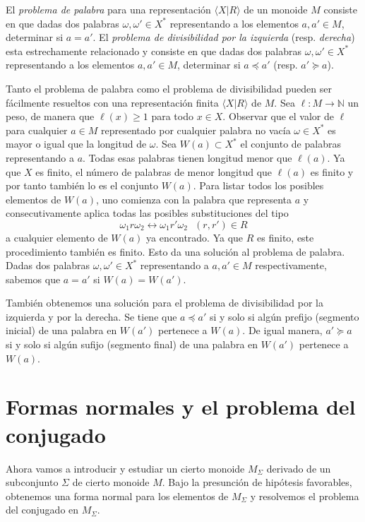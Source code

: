 \documentclass[12pt]{book}
\theoremstyle{definition}
\begin{document}
El \textit{problema de palabra} para una representación $\langle X|R\rangle$ de un monoide $M$ consiste en que dadas dos palabras $\omega,\omega'\in X^*$ representando a los elementos $a,a'\in M$, determinar si $a=a'$. El \textit{problema de divisibilidad por la izquierda} (resp. \textit{derecha}) esta estrechamente relacionado y consiste en que dadas
dos palabras $\omega,\omega'\in X^*$ representando a los elementos $a,a'\in M$, determinar si $a\preceq a'$ (resp. $a'\succeq a$).

Tanto el problema de palabra como el problema de divisibilidad pueden ser fácilmente resueltos con una representación finita $\langle X|R\rangle$ de $M$. Sea $\ell:M\rightarrow\mathbb{N}$ un peso, de manera que $\ell(x)\geq 1$ para todo $x\in X$. Observar que el valor de $\ell$ para cualquier $a\in M$ representado por cualquier palabra no vacía $\omega\in X^*$ es mayor o igual que la longitud de $\omega$. Sea $W(a)\subset X^*$ el conjunto de palabras representando a $a$. Todas esas palabras tienen longitud menor que $\ell(a)$. Ya que $X$ es finito, el número de palabras de menor longitud que $\ell(a)$ es finito y por tanto también lo es el conjunto $W(a)$. Para listar todos los posibles elementos de $W(a)$, uno comienza con la palabra que representa $a$ y consecutivamente aplica todas las posibles substituciones del tipo
$$\omega_1 r\omega_2\leftrightarrow \omega_1 r'\omega_2\ \ \ (r,r')\in R$$
a cualquier elemento de $W(a)$ ya encontrado. Ya que $R$ es finito, este procedimiento también es finito. Esto da una solución al problema de palabra. Dadas dos palabras $\omega,\omega'\in X^*$ representando a $a,a'\in M$ respectivamente, sabemos que $a=a'$ si $W(a)=W(a')$.

También obtenemos una solución para el problema de divisibilidad por la izquierda y por la derecha. Se tiene que $a\preceq a'$ si y solo si algún prefijo (segmento inicial) de una palabra en $W(a')$ pertenece a $W(a)$. De igual manera, $a'\succeq a$ si y solo si algún sufijo (segmento final) de una palabra en $W(a')$ pertenece a $W(a)$.

\section{Formas normales y el problema del conjugado}

Ahora vamos a introducir y estudiar un cierto monoide $M_\Sigma$ derivado de un subconjunto $\Sigma$ de cierto monoide $M$. Bajo la presunción de hipótesis favorables, obtenemos una forma normal para los elementos de $M_\Sigma$ y resolvemos el problema del conjugado en $M_\Sigma$.
\end{document}
